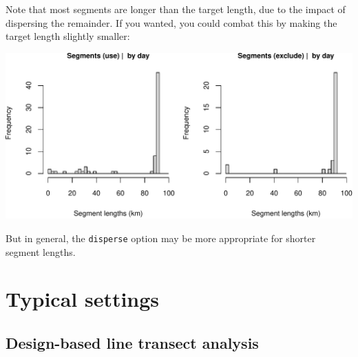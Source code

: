 \documentclass[
]{book}
\newenvironment{Shaded}{\begin{snugshade}}{\end{snugshade}}
\newcommand{\CommentTok}[1]{\textcolor[rgb]{0.56,0.35,0.01}{\textit{#1}}}
\newcommand{\DataTypeTok}[1]{\textcolor[rgb]{0.13,0.29,0.53}{#1}}
\newcommand{\DecValTok}[1]{\textcolor[rgb]{0.00,0.00,0.81}{#1}}
\newcommand{\KeywordTok}[1]{\textcolor[rgb]{0.13,0.29,0.53}{\textbf{#1}}}
\newcommand{\NormalTok}[1]{#1}
\newcommand{\OperatorTok}[1]{\textcolor[rgb]{0.81,0.36,0.00}{\textbf{#1}}}
\newcommand{\OtherTok}[1]{\textcolor[rgb]{0.56,0.35,0.01}{#1}}
\newcommand{\StringTok}[1]{\textcolor[rgb]{0.31,0.60,0.02}{#1}}
\begin{document}
Note that most segments are longer than the target length, due to the impact of dispersing the remainder. If you wanted, you could combat this by making the target length slightly smaller:

\begin{Shaded}
\end{Shaded}

\includegraphics{figures/unnamed-chunk-381-1.pdf}

But in general, the \texttt{disperse} option may be more appropriate for shorter segment lengths.

\hypertarget{typical-settings}{%
\section*{Typical settings}\label{typical-settings}}

\hypertarget{design-based-line-transect-analysis}{%
\subsection*{Design-based line transect analysis}\label{design-based-line-transect-analysis}}
\end{document}
